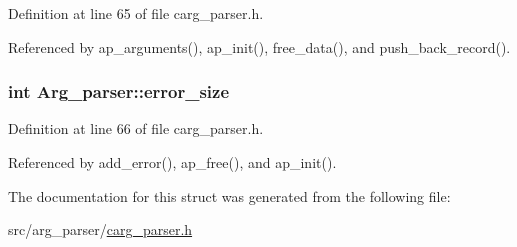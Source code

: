 Definition at line 65 of file carg\_\-parser.h.



Referenced by ap\_\-arguments(), ap\_\-init(), free\_\-data(), and push\_\-back\_\-record().

\hypertarget{structArg__parser_a024f512b62a4bd894f192b22b9e3ed36}{
\subsubsection[{error\_\-size}]{\setlength{\rightskip}{0pt plus 5cm}int {\bf Arg\_\-parser::error\_\-size}}}
\label{d3/d3f/structArg__parser_a024f512b62a4bd894f192b22b9e3ed36}


Definition at line 66 of file carg\_\-parser.h.



Referenced by add\_\-error(), ap\_\-free(), and ap\_\-init().



The documentation for this struct was generated from the following file:\begin{DoxyCompactItemize}
\item 
src/arg\_\-parser/\hyperlink{carg__parser_8h}{carg\_\-parser.h}\end{DoxyCompactItemize}
